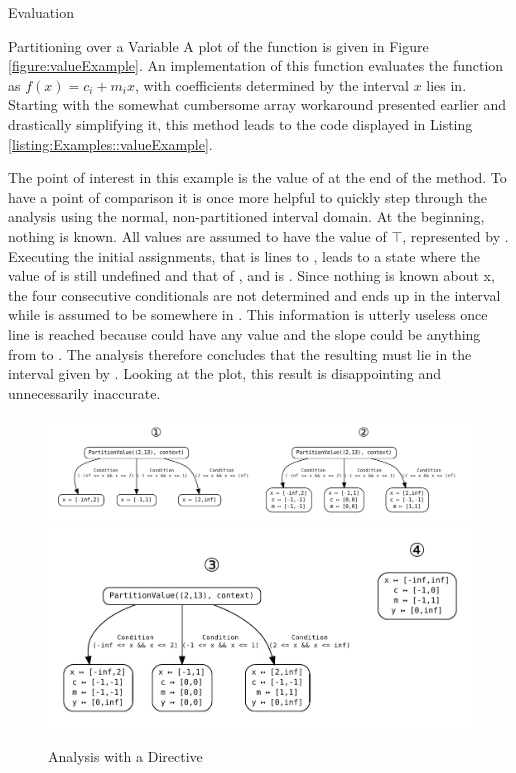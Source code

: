 \begin{chapter}{Evaluation}
\begin{section}{Partitioning over a Variable}
		A plot of the function is given in Figure \ref{figure:valueExample}. An implementation of this function evaluates the function as $f(x) = c_i + m_i x$, with coefficients determined by the interval $x$ lies in. Starting with the somewhat cumbersome array workaround presented earlier and drastically simplifying it, this method leads to the code displayed in Listing \ref{listing:Examples::valueExample}.

		

		The point of interest in this example is the value of  at the end of the method. To have a point of comparison it is once more helpful to quickly step through the analysis using the normal, non-partitioned interval domain. At the beginning, nothing is known. All values are assumed to have the value of $\top$, represented by . Executing the initial assignments, that is lines  to , leads to a state where the value of  is still undefined and that of ,  and  is \code{[0,0]}. Since nothing is known about x, the four consecutive conditionals are not determined and  ends up in the interval \code{[-1,0]} while  is assumed to be somewhere in \code{[-1,1]}. This information is utterly useless once line  is reached because  could have any value and the slope could be anything from  to . The analysis therefore concludes that the resulting  must lie in the interval given by . Looking at the plot, this result is disappointing and unnecessarily inaccurate.

		\begin{figure}[t]
			\centering
			\includegraphics[width=\textwidth]{Graphs/PartitionValueExample1.pdf}
			\includegraphics[scale=0.5]{Graphs/PartitionValueExample2.pdf}
			\caption{Analysis with a  Directive}
			\label{figure:PartitionValueExample}
		\end{figure}


\end{section}
\end{chapter}
